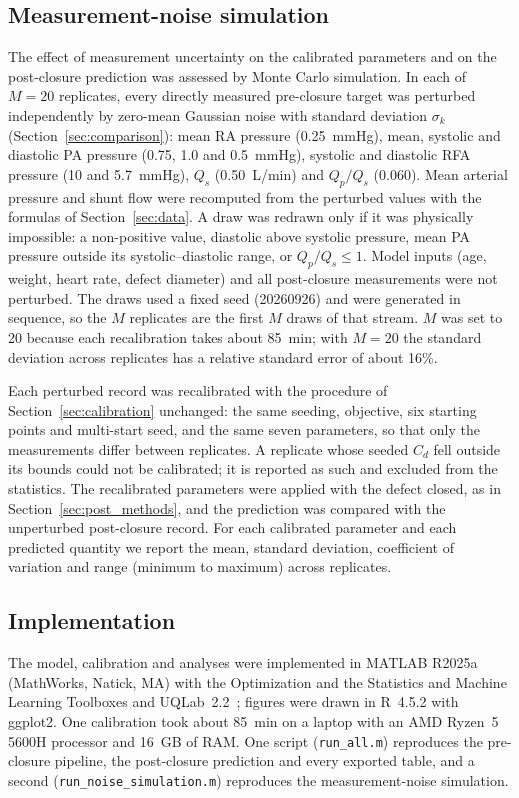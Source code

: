\documentclass{article}
\begin{document}
\FloatBarrier
\subsection{Measurement-noise simulation}
\label{sec:noise_methods}
The effect of measurement uncertainty on the calibrated parameters and on the post-closure prediction was assessed by Monte Carlo simulation. In each of $M = 20$ replicates, every directly measured pre-closure target was perturbed independently by zero-mean Gaussian noise with standard deviation $\sigma_k$ (Section~\ref{sec:comparison}): mean RA pressure (0.25~mmHg), mean, systolic and diastolic PA pressure (0.75, 1.0 and 0.5~mmHg), systolic and diastolic RFA pressure (10 and 5.7~mmHg), $Q_s$ (0.50~L/min) and $Q_p/Q_s$ (0.060). Mean arterial pressure and shunt flow were recomputed from the perturbed values with the formulas of Section~\ref{sec:data}. A draw was redrawn only if it was physically impossible: a non-positive value, diastolic above systolic pressure, mean PA pressure outside its systolic--diastolic range, or $Q_p/Q_s \le 1$. Model inputs (age, weight, heart rate, defect diameter) and all post-closure measurements were not perturbed. The draws used a fixed seed (20260926) and were generated in sequence, so the $M$ replicates are the first $M$ draws of that stream. $M$ was set to 20 because each recalibration takes about 85~min; with $M = 20$ the standard deviation across replicates has a relative standard error of about 16\%.

Each perturbed record was recalibrated with the procedure of Section~\ref{sec:calibration} unchanged: the same seeding, objective, six starting points and multi-start seed, and the same seven parameters, so that only the measurements differ between replicates. A replicate whose seeded $C_d$ fell outside its bounds could not be calibrated; it is reported as such and excluded from the statistics. The recalibrated parameters were applied with the defect closed, as in Section~\ref{sec:post_methods}, and the prediction was compared with the unperturbed post-closure record. For each calibrated parameter and each predicted quantity we report the mean, standard deviation, coefficient of variation and range (minimum to maximum) across replicates.

\FloatBarrier
\subsection{Implementation}
The model, calibration and analyses were implemented in MATLAB R2025a (MathWorks, Natick, MA) with the Optimization and the Statistics and Machine Learning Toolboxes and UQLab~2.2~\cite{Marelli2014}; figures were drawn in R~4.5.2 with ggplot2. One calibration took about 85~min on a laptop with an AMD Ryzen~5 5600H processor and 16~GB of RAM. One script (\texttt{run\_all.m}) reproduces the pre-closure pipeline, the post-closure prediction and every exported table, and a second (\texttt{run\_noise\_simulation.m}) reproduces the measurement-noise simulation.
\end{document}
